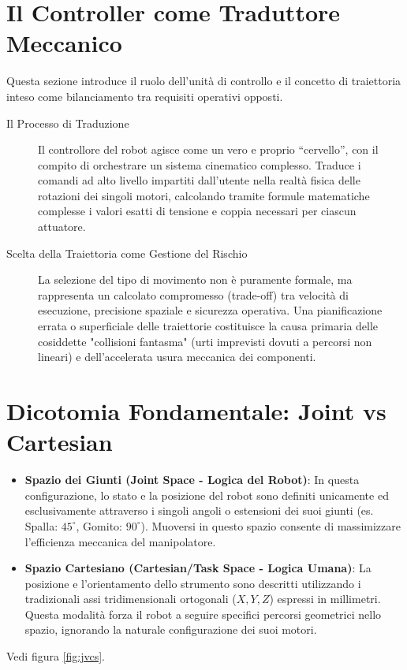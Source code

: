 %
%
\section{Il Controller come Traduttore Meccanico}
Questa sezione introduce il ruolo dell'unità di controllo e il concetto di traiettoria inteso come bilanciamento tra requisiti operativi opposti.
\begin{description}
    \item [Il Processo di Traduzione] Il controllore del robot agisce come un vero e proprio ``cervello'', con il compito di orchestrare un sistema cinematico complesso. Traduce i comandi ad alto livello impartiti dall'utente nella realtà fisica delle rotazioni dei singoli motori, calcolando tramite formule matematiche complesse i valori esatti di tensione e coppia necessari per ciascun attuatore.
    \item [Scelta della Traiettoria come Gestione del Rischio] La selezione del tipo di movimento non è puramente formale, ma rappresenta un calcolato compromesso (trade-off) tra velocità di esecuzione, precisione spaziale e sicurezza operativa. Una pianificazione errata o superficiale delle traiettorie costituisce la causa primaria delle cosiddette "collisioni fantasma" (urti imprevisti dovuti a percorsi non lineari) e dell'accelerata usura meccanica dei componenti.
\end{description}

%
\section{Dicotomia Fondamentale: Joint vs Cartesian}
\begin{itemize}
    \item \textbf{Spazio dei Giunti (Joint Space - Logica del Robot)}: In questa configurazione, lo stato e la posizione del robot sono definiti unicamente ed esclusivamente attraverso i singoli angoli o estensioni dei suoi giunti (es. Spalla: $45^\circ$, Gomito: $90^\circ$). Muoversi in questo spazio consente di massimizzare l'efficienza meccanica del manipolatore.
    \item \textbf{Spazio Cartesiano (Cartesian/Task Space - Logica Umana)}: La posizione e l'orientamento dello strumento sono descritti utilizzando i tradizionali assi tridimensionali ortogonali ($X, Y, Z$) espressi in millimetri. Questa modalità forza il robot a seguire specifici percorsi geometrici nello spazio, ignorando la naturale configurazione dei suoi motori.
\end{itemize}
Vedi figura \ref{fig:jvcs}.

